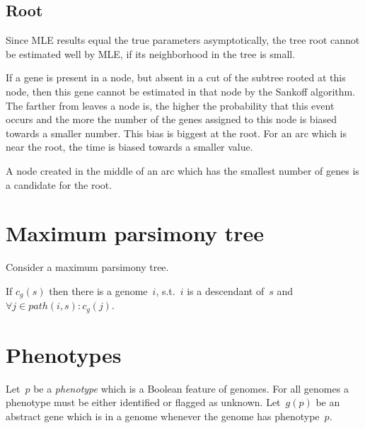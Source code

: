\documentclass[10pt,a4paper]{article}
\theoremstyle{plain} \newtheorem{Lem}{Lemma}
\begin{document}
\subsection {Root}
Since MLE results equal the true parameters asymptotically,
the tree root cannot be estimated well by MLE, if its neighborhood in the tree is small.

If a gene is present in a node, but absent in a cut of the subtree rooted at this node, then this gene cannot be estimated in that node by the Sankoff algorithm.
The farther from leaves a node is,
the higher the probability that this event occurs
and the more the number of the genes assigned to this node is biased towards a smaller number.
This bias is biggest at the root.
For an arc which is near the root, the time is biased towards a smaller value.

A node created in the middle of an arc which has the smallest number of genes is a candidate for the root.


\section{Maximum parsimony tree}

Consider a maximum parsimony tree.

If $c_g(s)$ then there is a genome~$i$, s.t.~$i$ is a descendant of~$s$ and $\forall j \in path(i,s) : c_g(j)$.




\section{Phenotypes}
Let~$p$ be a {\em phenotype} which is a Boolean feature of genomes.
For all genomes a phenotype must be either identified or flagged as unknown.
Let~$g(p)$ be an abstract gene which is in a genome whenever the genome has phenotype~$p$.
\end{document}
